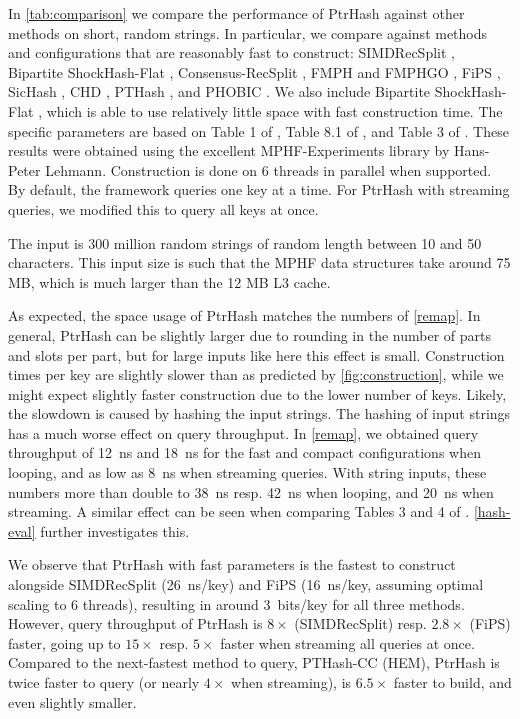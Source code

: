 \documentclass[a4paper,UKenglish,cleveref,thm-restate]{lipics-v2021}
\begin{document}
In \cref{tab:comparison} we compare the performance of PtrHash against other methods on
short, random strings.
In particular, we compare against methods and configurations that are reasonably fast to construct:
SIMDRecSplit \cite{recsplit,recsplit-gpu},
Bipartite ShockHash-Flat \cite{shockhash,bipartite-shockhash},
Consensus-RecSplit \cite{consensus},
FMPH and FMPHGO \cite{fmph},
FiPS \cite{phf-thesis},
SicHash \cite{sichash},
CHD \cite{chd},
PTHash \cite{pthash,pthash-2},
and PHOBIC \cite{phobic}.
We also include Bipartite ShockHash-Flat \cite{shockhash,bipartite-shockhash},
which is able to use relatively little space with fast construction time.
The specific parameters are based on Table 1 of \cite{phobic}, Table 8.1 of
\cite{phf-thesis}, and Table 3 of \cite{fmph}.
These results were obtained using the excellent MPHF-Experiments library
\cite{mphf-experiments} by Hans-Peter Lehmann. Construction is done on 6
threads in parallel when supported. By default, the framework queries
one key at a time. For PtrHash with streaming queries, we modified this to query
all keys at once.
\vspace{-1em}

The input is 300 million random strings of random length between 10 and 50
characters. This input size is such that the MPHF data structures take around
75 MB, which is much larger than the 12 MB L3 cache.

 As expected, the space usage of PtrHash matches the numbers of \cref{remap}.
In general, PtrHash can be slightly larger due to rounding in the number of
parts and slots per part, but for large inputs like here this effect is small.
Construction times per key are slightly slower than as predicted by
\cref{fig:construction}, while we might expect slightly faster construction due to the
lower number of keys. Likely, the slowdown is caused by hashing the input strings.
The hashing of input strings has a much worse effect on query throughput. In
\cref{remap}, we obtained query throughput of 12~ns and 18~ns for the fast and compact
configurations when looping, and as low as 8~ns when streaming queries. With
string inputs, these numbers more than double to 38~ns resp. 42~ns when looping,
and 20~ns when streaming. A similar effect can be seen when comparing Tables 3
and 4 of \cite{fmph}. \cref{hash-eval} further investigates this.

We observe that PtrHash with fast parameters is the fastest to construct
alongside SIMDRecSplit (26~ns/key) and FiPS (16~ns/key, assuming optimal scaling to
6 threads),  resulting in around 3~bits/key for all three methods.
However, query throughput of PtrHash is \(8\times\) (SIMDRecSplit) resp.
\(2.8\times\) (FiPS) faster, going up to \(15\times\) resp.
\(5\times\) faster when streaming all queries at once.
Compared to the next-fastest method to query, PTHash-CC (HEM), PtrHash is twice
faster to query (or nearly \(4\times\) when streaming), is \(6.5\times\) faster to build, and
even slightly smaller.
\end{document}
